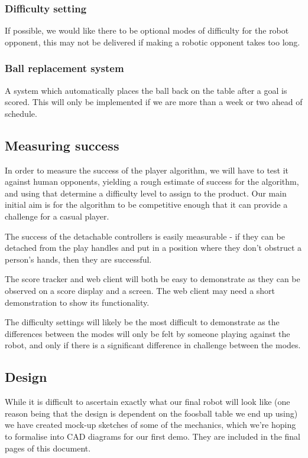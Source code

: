 \documentclass{article}
\begin{document}
\subsubsection{Difficulty setting} If possible, we would like there to be optional modes of difficulty for the robot opponent, this may not be delivered if making a robotic opponent takes too long. 
\subsubsection{Ball replacement system} A system which automatically places the ball back on the table after a goal is scored. This will only be implemented if we are more than a week or two ahead of schedule.

\subsection{Measuring success}

 In order to measure the success of the player algorithm, we will have to test it against human opponents, yielding a rough estimate of success for the algorithm, and using that determine a difficulty level to assign to the product. Our main initial aim is for the algorithm to be competitive enough that it can provide a challenge for a casual player. 
 
 The success of the detachable controllers is easily measurable - if they can be detached from the play handles and put in a position where they don’t obstruct a person’s hands, then they are successful. 
 
 The score tracker and web client will both be easy to demonstrate as they can be observed on a score display and a screen. The web client may need a short demonstration to show its functionality. 
 
 The difficulty settings will likely be the most difficult to demonstrate as the differences between the modes will only be felt by someone playing against the robot, and only if there is a significant difference in challenge between the modes.

 \subsection{Design}
 While it is difficult to ascertain exactly what our final robot will look like (one reason being that the design is dependent on the foosball table we end up using) we have created mock-up sketches of some of the mechanics, which we're hoping to formalise into CAD diagrams for our first demo. They are included in the final pages of this document.
\end{document}
